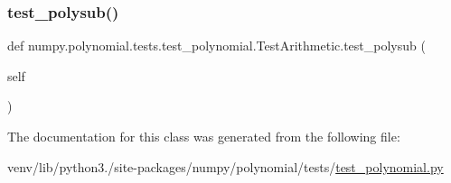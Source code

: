 \subsubsection{\texorpdfstring{test\+\_\+polysub()}{test\_polysub()}}
{\footnotesize\ttfamily def numpy.\+polynomial.\+tests.\+test\+\_\+polynomial.\+Test\+Arithmetic.\+test\+\_\+polysub (\begin{DoxyParamCaption}\item[{}]{self }\end{DoxyParamCaption})}



The documentation for this class was generated from the following file\+:\begin{DoxyCompactItemize}
\item 
venv/lib/python3./site-\/packages/numpy/polynomial/tests/\hyperlink{polynomial_2tests_2test__polynomial_8py}{test\+\_\+polynomial.\+py}\end{DoxyCompactItemize}
